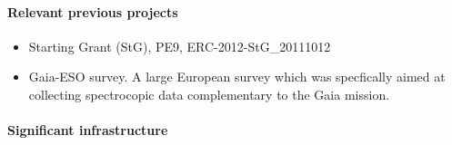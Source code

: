 \paragraph{Relevant previous projects}

\begin{itemize}
    \item Starting Grant (StG), PE9, ERC-2012-StG\_20111012
    \item Gaia-ESO survey. A large European survey which was specfically aimed at collecting spectrocopic data complementary to the Gaia mission.
\end{itemize}

\paragraph{Significant infrastructure}